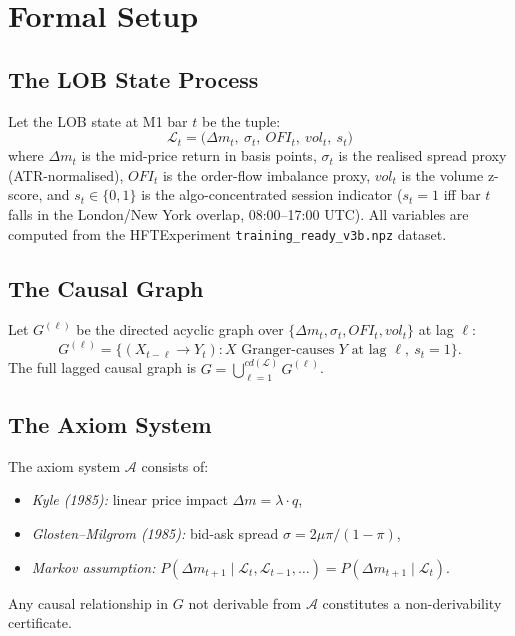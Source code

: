 \documentclass[12pt]{article}
\begin{document}
\section{Formal Setup}
\label{sec:setup}

\subsection{The LOB State Process}

Let the LOB state at M1 bar $t$ be the tuple:
\begin{equation}
\mathcal{L}_t = \bigl(\Delta m_t,\ \sigma_t,\ \mathit{OFI}_t,
                       \ \mathit{vol}_t,\ s_t\bigr)
\end{equation}
where $\Delta m_t$ is the mid-price return in basis points,
$\sigma_t$ is the realised spread proxy (ATR-normalised),
$\mathit{OFI}_t$ is the order-flow imbalance proxy,
$\mathit{vol}_t$ is the volume z-score,
and $s_t \in \{0,1\}$ is the algo-concentrated session indicator
($s_t = 1$ iff bar $t$ falls in the London/New York overlap,
08:00--17:00 UTC).
All variables are computed from the HFTExperiment
\texttt{training\_ready\_v3b.npz} dataset.

\subsection{The Causal Graph}

Let $G^{(\ell)}$ be the directed acyclic graph over
$\{\Delta m_t, \sigma_t, \mathit{OFI}_t, \mathit{vol}_t\}$
at lag $\ell$:
\begin{equation}
G^{(\ell)} = \bigl\{(X_{t-\ell} \to Y_t) :
  X \text{ Granger-causes } Y \text{ at lag } \ell,\ s_t = 1\bigr\}.
\end{equation}
The full lagged causal graph is
$G = \bigcup_{\ell=1}^{cd(\mathcal{L})} G^{(\ell)}$.

\subsection{The Axiom System}

The axiom system $\mathcal{A}$ consists of:
\begin{itemize}
\item \textit{Kyle (1985):} linear price impact
      $\Delta m = \lambda \cdot q$,
\item \textit{Glosten--Milgrom (1985):} bid-ask spread
      $\sigma = 2\mu\pi/(1-\pi)$,
\item \textit{Markov assumption:}
      $P(\Delta m_{t+1} \mid \mathcal{L}_t, \mathcal{L}_{t-1},\ldots)
       = P(\Delta m_{t+1} \mid \mathcal{L}_t)$.
\end{itemize}
Any causal relationship in $G$ not derivable from $\mathcal{A}$
constitutes a non-derivability certificate.
\end{document}
